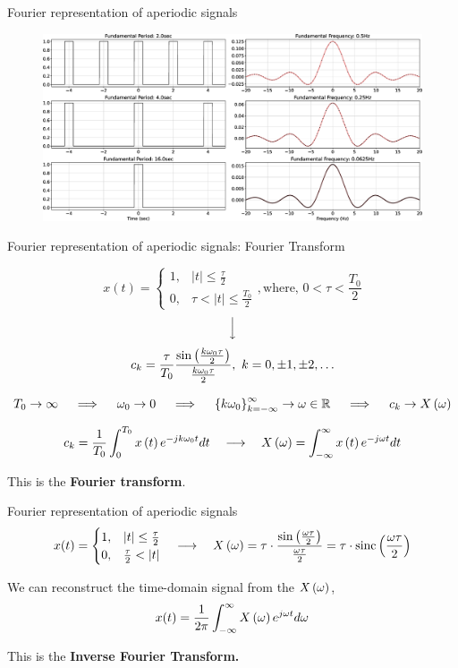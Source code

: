 \documentclass[aspectratio=169]{beamer}
\def\mb{\ensuremath\mathbb}
\def\lp{\ensuremath\left(}
\def\rp{\ensuremath\right)}
\begin{document}
\begin{frame}{Fourier representation of aperiodic signals}
\begin{figure}
\includegraphics[width=1.0\textwidth]{img/fs-cont.eps}
\end{figure}
\end{frame}


\begin{frame}[t]{Fourier representation of aperiodic signals: Fourier Transform}
\begin{small}
\[ x(t) = \begin{cases}
1, & \vert t \vert \leq \frac{\tau}{2} \\
0, & \tau < \vert t \vert \leq \frac{T_0}{2} 
\end{cases}, \text{where, } 0 < \tau < \frac{T_0}{2} \]
\[ \Big\downarrow \]
\[ c_k = \frac{\tau}{T_0} \frac{\sin \lp \frac{k \omega_0 \tau}{2} \rp}{\frac{k \omega_0 \tau}{2}}, \,\, k = 0, \pm 1 , \pm 2, \ldots \]
\end{small}

\[ T_0 \to \infty \quad \implies \quad \omega_0 \to 0 \quad \implies \quad \left\{ k \omega_0 \right\}_{k=-\infty}^{\infty} \to \omega \in \mb{R} \quad \implies \quad c_k \to X\lp \omega \rp \]

\[ c_k = \frac{1}{T_0} \int_{0}^{T_0} x\lp t \rp e^{-jk\omega_0 t} dt \quad \longrightarrow \quad X\lp \omega \rp = \int_{-\infty}^{\infty} x\lp t \rp e^{-j\omega t} dt \]
\vspace{0.2cm}

This is the \textbf{Fourier transform}.
\end{frame}


\begin{frame}[t]{Fourier representation of aperiodic signals}
\[ x(t) = \begin{cases}
1, & \vert t \vert \leq \frac{\tau}{2} \\
0, & \frac{\tau}{2} < \vert t \vert 
\end{cases} \quad \longrightarrow \quad X\lp \omega \rp = \tau \cdot \frac{\sin\lp \frac{\omega \tau}{2} \rp}{\frac{\omega \tau}{2}} = \tau \cdot \mathrm{sinc}\lp \frac{\omega \tau}{2} \rp \]
\vspace{0.2cm}

We can reconstruct the time-domain signal from the $X\lp \omega \rp$,
\[ x(t) = \frac{1}{2\pi} \int_{-\infty}^{\infty} X\lp \omega \rp e^{j\omega t} d\omega \]
\vspace{0.2cm}

This is the \textbf{Inverse Fourier Transform.}

\end{frame}
\end{document}
